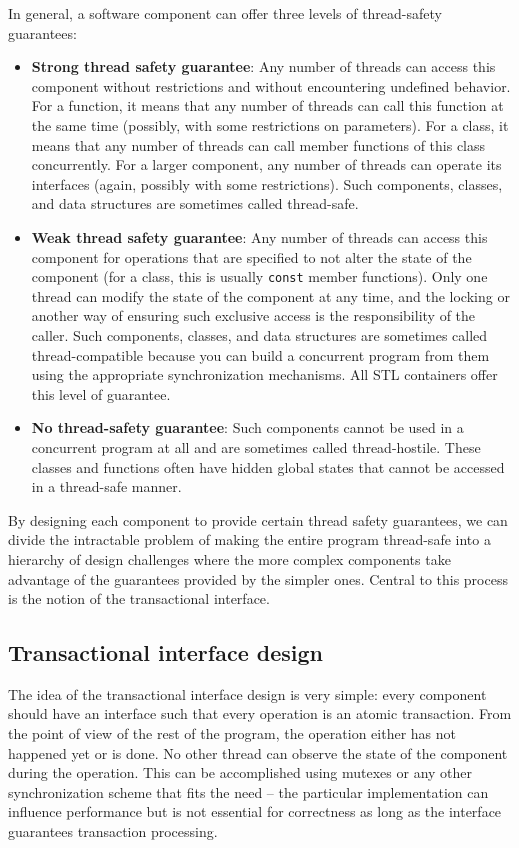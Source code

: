 In general, a software component can offer three levels of thread-safety guarantees:

\begin{itemize}
\item
  \textbf{Strong thread safety guarantee}: Any number of threads can access this component without restrictions and without encountering undefined behavior. For a function, it means that any number of threads can call this function at the same time (possibly, with some restrictions on parameters). For a class, it means that any number of threads can call member functions of this class concurrently. For a larger component, any number of threads can operate its interfaces (again, possibly with some restrictions). Such components, classes, and data structures are sometimes called thread-safe.
\item
  \textbf{Weak thread safety guarantee}: Any number of threads can access this component for operations that are specified to not alter the state of the component (for a class, this is usually \texttt{const} member functions). Only one thread can modify the state of the component at any time, and the locking or another way of ensuring such exclusive access is the responsibility of the caller. Such components, classes, and data structures are sometimes called thread-compatible because you can build a concurrent program from them using the appropriate synchronization mechanisms. All STL containers offer this level of guarantee.
\item
  \textbf{No thread-safety guarantee}: Such components cannot be used in a concurrent program at all and are sometimes called thread-hostile. These classes and functions often have hidden global states that cannot be accessed in a thread-safe manner.
\end{itemize}

By designing each component to provide certain thread safety guarantees, we can divide the intractable problem of making the entire program thread-safe into a hierarchy of design challenges where the more complex components take advantage of the guarantees provided by the simpler ones. Central to this process is the notion of the transactional interface.

\subsection{Transactional interface design}

The idea of the transactional interface design is very simple: every component should have an interface such that every operation is an atomic transaction. From the point of view of the rest of the program, the operation either has not happened yet or is done. No other thread can observe the state of the component during the operation. This can be accomplished using mutexes or any other synchronization scheme that fits the need -- the particular implementation can influence performance but is not essential for correctness as long as the interface guarantees transaction processing.

